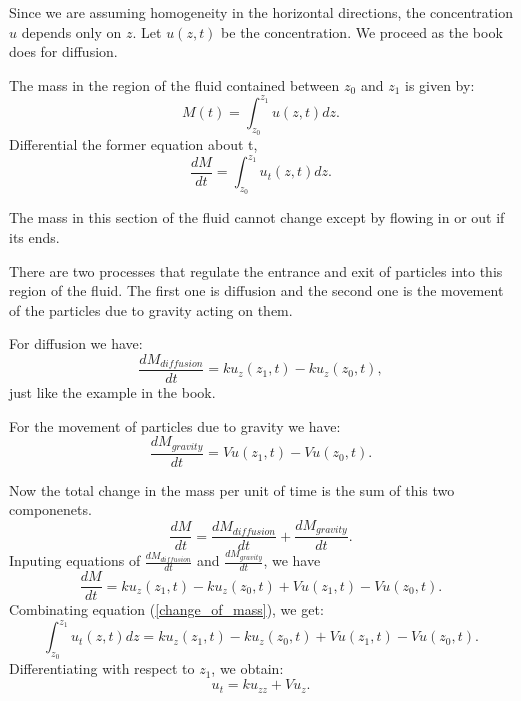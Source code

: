 \documentclass{article}
\begin{document}
			Since we are assuming homogeneity in the horizontal
			directions, the concentration $u$ depends only on $z$.
			Let $u(z,t)$ be the concentration. We proceed as the
			book does for diffusion.

			The mass in the region of the fluid contained between
			$z_0$ and $z_1$ is given by:
            \begin{equation*}
				M(t) = \int_{z_0}^{z_1} u(z,t)dz.
			\end{equation*}
			Differential the former equation about t,
			\begin{equation}\label{change_of_mass}
				\frac{dM}{dt}=\int_{z_0}^{z_1}u_t(z,t)dz.
			\end{equation}

			The mass in this section of the fluid cannot change
			except by flowing in or out if its ends.

			There are two processes that regulate the entrance and
			exit of particles into this region of the fluid.
			The first one is diffusion and the second one is the
			movement of the particles due to gravity acting on
			them.

			For diffusion we have:
			\[\frac{dM_{diffusion}}{dt}=ku_z(z_1,t)-ku_z(z_0,t),\]
			just like the example in the book.

			For the movement of particles due to gravity we have:
			\[\frac{dM_{gravity}}{dt} = Vu(z_1,t) - Vu(z_0,t).\]

			Now the total change in the mass per unit of time is
			the sum of this two componenets.
			\[\frac{dM}{dt}=\frac{dM_{diffusion}}{dt}+\frac{dM_{gravity}}{dt}.\]
			Inputing equations of $\frac{dM_{diffusion}}{dt} $ and $\frac{dM_{gravity}}{dt} $, we have
            \[\frac{dM}{dt}=ku_z(z_1,t)-ku_z(z_0,t) + Vu(z_1,t) - Vu(z_0,t). \]			
			Combinating equation (\ref{change_of_mass}), we get:
			\[\int_{z_0}^{z_1}u_t(z,t)dz= ku_z(z_1,t)-ku_z(z_0,t) + Vu(z_1,t) - Vu(z_0,t).\]
			Differentiating with respect to $z_1$, we obtain:
			\[
				u_t=ku_{zz}+Vu_z.
			\]
\end{document}
